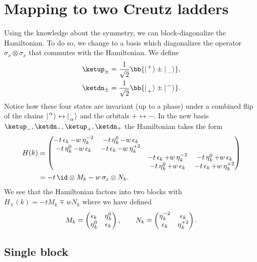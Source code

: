 \section{Mapping to two Creutz ladders}
Using the knowledge about the symmetry, we can block-diagonalize the Hamiltonian. To do so, we change to a basis which diagonalizes the operator $\sigma_x \otimes \sigma_x$ that commutes with the Hamiltonian. We define
\begin{align}
    \ketup_\pm = \frac{1}{\sqrt{2}} \bb{ \upp \pm \dnm }, \\
    \ketdn_\pm = \frac{1}{\sqrt{2}} \bb{ \dnp \pm \upm }.
\end{align}
Notice how these four states are invariant (up to a phase) under a combined flip of the chains $\ladderKet{\alpha}{} \leftrightarrow \ladderKet{}{\alpha}$ and the orbitals $+ \leftrightarrow -$.
In the new basis $\ketup_-, \ketdn_-, \ketup_+, \ketdn_+$ the Hamiltonian takes the form
\begin{align}
    H(k) &=
    \begin{pmatrix}
        -t\ep_k -w\et_k^{-2} & -t\et_k^0 -w\ep_k &  &  \\
        -t\et^0_k - w\ep_k & -t \ep_k - w\et_k^{+2} &  &  \\
         &  & -t\ep_k +w\et_k^{-2} & -t\et_k^0 +w\ep_k \\
         &  & -t\et^0_k + w\ep_k & -t \ep_k + w\et_k^{+2}
    \end{pmatrix} \\
    &= - t \, \id \otimes M_k - w \, \sigma_z \otimes N_k.
\end{align}
We see that the Hamiltonian factors into two blocks with $H_\mp(k) = -t M_k \mp w N_k$ where we have defined
\begin{align}
    M_k = \begin{pmatrix}
        \operatorname{\epsilon}_k & \operatorname{\eta}_k^0 \\
        \operatorname{\eta}_k^0 & \operatorname{\epsilon}_k
    \end{pmatrix},\qquad
    N_k = \begin{pmatrix}
    \operatorname{\eta}_k^{-2} & \operatorname{\epsilon}_k \\
    \operatorname{\epsilon}_k & \operatorname{\eta}_k^{+2}
    \end{pmatrix}.
\end{align}


\subsection{Single block}


